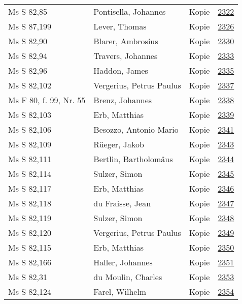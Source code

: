 \documentclass[10pt,a4paper,landscape]{report}
\begin{document}
\begin{longtable}{p{16cm}p{4cm}lr}
Ms S 82,85	&	Pontisella, Johannes	&	Kopie	&	\href{http://130.60.24.72/assignment/2322}{2322}\\
Ms S 87,199	&	Lever, Thomas	&	Kopie	&	\href{http://130.60.24.72/assignment/2326}{2326}\\
Ms S 82,90	&	Blarer, Ambrosius	&	Kopie	&	\href{http://130.60.24.72/assignment/2330}{2330}\\
Ms S 82,94	&	Travers, Johannes	&	Kopie	&	\href{http://130.60.24.72/assignment/2333}{2333}\\
Ms S 82,96	&	Haddon, James	&	Kopie	&	\href{http://130.60.24.72/assignment/2335}{2335}\\
Ms S 82,102	&	Vergerius, Petrus Paulus	&	Kopie	&	\href{http://130.60.24.72/assignment/2337}{2337}\\
Ms F 80, f. 99, Nr. 55	&	Brenz, Johannes	&	Kopie	&	\href{http://130.60.24.72/assignment/2338}{2338}\\
Ms S 82,103	&	Erb, Matthias	&	Kopie	&	\href{http://130.60.24.72/assignment/2339}{2339}\\
Ms S 82,106	&	Besozzo, Antonio Mario	&	Kopie	&	\href{http://130.60.24.72/assignment/2341}{2341}\\
Ms S 82,109	&	Rüeger, Jakob	&	Kopie	&	\href{http://130.60.24.72/assignment/2343}{2343}\\
Ms S 82,111	&	Bertlin, Bartholomäus	&	Kopie	&	\href{http://130.60.24.72/assignment/2344}{2344}\\
Ms S 82,114	&	Sulzer, Simon	&	Kopie	&	\href{http://130.60.24.72/assignment/2345}{2345}\\
Ms S 82,117	&	Erb, Matthias	&	Kopie	&	\href{http://130.60.24.72/assignment/2346}{2346}\\
Ms S 82,118	&	du Fraisse, Jean	&	Kopie	&	\href{http://130.60.24.72/assignment/2347}{2347}\\
Ms S 82,119	&	Sulzer, Simon	&	Kopie	&	\href{http://130.60.24.72/assignment/2348}{2348}\\
Ms S 82,120	&	Vergerius, Petrus Paulus	&	Kopie	&	\href{http://130.60.24.72/assignment/2349}{2349}\\
Ms S 82,115	&	Erb, Matthias	&	Kopie	&	\href{http://130.60.24.72/assignment/2350}{2350}\\
Ms S 82,166	&	Haller, Johannes	&	Kopie	&	\href{http://130.60.24.72/assignment/2351}{2351}\\
Ms S 82,31	&	du Moulin, Charles	&	Kopie	&	\href{http://130.60.24.72/assignment/2353}{2353}\\
Ms S 82,124	&	Farel, Wilhelm	&	Kopie	&	\href{http://130.60.24.72/assignment/2354}{2354}\\

\end{longtable}
\end{document}
